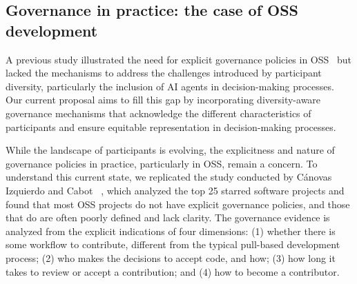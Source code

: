 \subsection{Governance in practice: the case of OSS development}
\label{sec:motivation:governance-oss}

A previous study illustrated the need for explicit governance policies in OSS~\cite{DBLP:conf/icse/IzquierdoC15} but lacked the mechanisms to address the challenges introduced by participant diversity, particularly the inclusion of AI agents in decision-making processes.
Our current proposal aims to fill this gap by incorporating diversity-aware governance mechanisms that acknowledge the different characteristics of participants and ensure equitable representation in decision-making processes.


While the landscape of participants is evolving, the explicitness and nature of governance policies in practice, particularly in OSS, remain a concern. 
To understand this current state, we replicated the study conducted by C\'anovas Izquierdo and Cabot
~\cite{DBLP:journals/cacm/IzquierdoC23}, which analyzed the top 25 starred software projects and found that most OSS projects do not have explicit governance policies, and those that do are often poorly defined and lack clarity.
The governance evidence is analyzed from the explicit indications of four dimensions: 
(1) whether there is some workflow to contribute, different from the typical pull-based development process; 
(2) who makes the decisions to accept code, and how; 
(3) how long it takes to review or accept a contribution; 
and (4) how to become a contributor.


